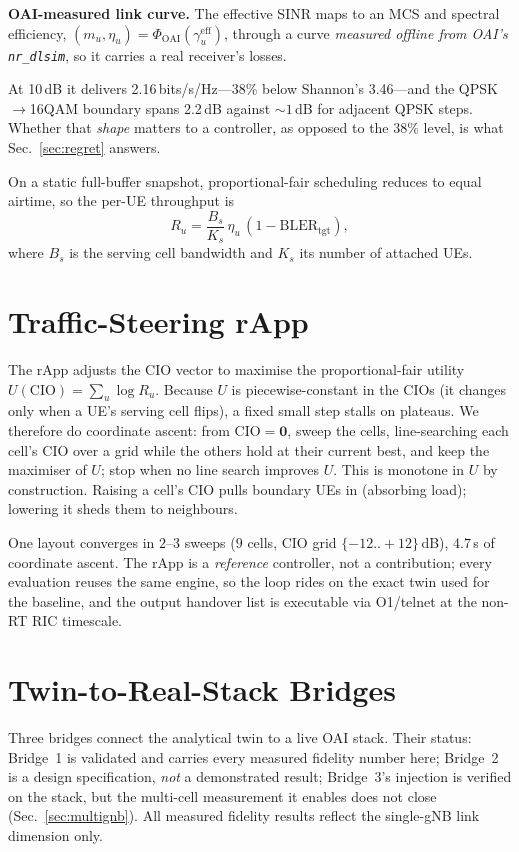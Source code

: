 \documentclass[conference]{IEEEtran}
\begin{document}
\textbf{OAI-measured link curve.} The effective SINR maps to an MCS and spectral efficiency, $(m_u,\eta_u)=\Phi_{\mathrm{OAI}}(\gamma^{\mathrm{eff}}_u)$, through a curve \emph{measured offline from OAI's \texttt{nr\_dlsim}}, so it carries a real receiver's losses.

At 10\,dB it delivers 2.16\,bits/s/Hz---38\% below Shannon's 3.46---and the QPSK$\to$16QAM boundary spans 2.2\,dB against ${\sim}1$\,dB for adjacent QPSK steps. Whether that \emph{shape} matters to a controller, as opposed to the $38\%$ level, is what Sec.~\ref{sec:regret} answers.


On a static full-buffer snapshot, proportional-fair scheduling reduces to equal airtime, so the per-UE throughput is
\begin{equation}
R_u=\frac{B_{s}}{K_{s}}\,\eta_u\,(1-\mathrm{BLER}_{\mathrm{tgt}}),
\label{eq:rate}
\end{equation}
where $B_s$ is the serving cell bandwidth and $K_s$ its number of attached UEs.

\section{Traffic-Steering rApp}
The rApp adjusts the CIO vector to maximise the proportional-fair utility $U(\mathrm{CIO})=\sum_u\log R_u$. Because $U$ is piecewise-constant in the CIOs (it changes only when a UE's serving cell flips), a fixed small step stalls on plateaus. We therefore do coordinate ascent: from $\mathrm{CIO}=\mathbf{0}$, sweep the cells, line-searching each cell's CIO over a grid while the others hold at their current best, and keep the maximiser of $U$; stop when no line search improves $U$. This is monotone in $U$ by construction. Raising a cell's CIO pulls boundary UEs in (absorbing load); lowering it sheds them to neighbours.

One layout converges in $2$--$3$ sweeps ($9$ cells, CIO grid $\{-12..{+}12\}$\,dB), $4.7$\,s of coordinate ascent. The rApp is a \emph{reference} controller, not a contribution; every evaluation reuses the same engine, so the loop rides on the exact twin used for the baseline, and the output handover list is executable via O1/telnet at the non-RT RIC timescale.

\section{Twin-to-Real-Stack Bridges}
\label{sec:bridges}
Three bridges connect the analytical twin to a live OAI stack. Their status: Bridge~1 is validated and carries every measured fidelity number here; Bridge~2 is a design specification, \emph{not} a demonstrated result; Bridge~3's injection is verified on the stack, but the multi-cell measurement it enables does not close (Sec.~\ref{sec:multignb}). All measured fidelity results reflect the single-gNB link dimension only.
\end{document}
